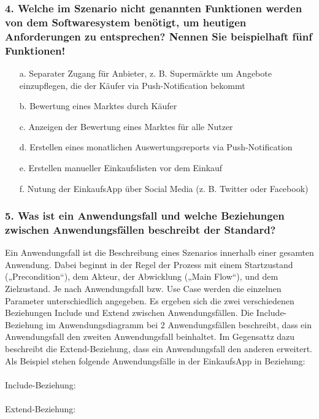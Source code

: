 \documentclass[12pt,a4paper]{article}
\begin{document}
\subsubsection*{4. Welche im Szenario nicht genannten Funktionen werden von dem Softwaresystem benötigt, um heutigen Anforderungen zu entsprechen? Nennen Sie beispielhaft fünf Funktionen!}
\begin{itemize}
\item[a.] Separater Zugang für Anbieter, z. B. Supermärkte um Angebote einzupflegen, die der Käufer via Push-Notification bekommt
\item[b.] Bewertung eines Marktes durch Käufer
\item[c.] Anzeigen der Bewertung eines Marktes für alle Nutzer
\item[d.] Erstellen eines monatlichen Auswertungsreports via Push-Notification 
\item[e.] Erstellen manueller Einkaufslisten vor dem Einkauf 
\item[f.] Nutung der EinkaufsApp über Social Media (z. B. Twitter oder Facebook)
\end{itemize}
 
 
\subsubsection*{5. Was ist ein Anwendungsfall und welche Beziehungen zwischen Anwendungsfällen beschreibt der Standard?}
Ein Anwendungsfall ist die Beschreibung eines Szenarios innerhalb einer gesamten Anwendung. 
Dabei beginnt in der Regel der Prozess mit einem Startzustand („Precondition“), dem Akteur, der Abwicklung („Main Flow“), und dem Zielzustand. 
Je nach Anwendungsfall bzw. Use Case werden die einzelnen Parameter unterschiedlich angegeben.  Es ergeben sich die zwei verschiedenen Beziehungen Include und Extend zwischen Anwendungsfällen.
Die Include-Beziehung im Anwendungsdiagramm bei 2 Anwendungsfällen beschreibt, dass ein Anwendungsfall den zweiten Anwendungsfall beinhaltet. Im Gegensattz dazu beschreibt die Extend-Beziehung, dass ein Anwendungsfall den anderen erweitert.
\\
Als Beispiel stehen folgende Anwendungsfälle in der EinkaufsApp in Beziehung:
\\
\\
Include-Beziehung:
\\
\\
Extend-Beziehung:
\\
\newpage
\end{document}

